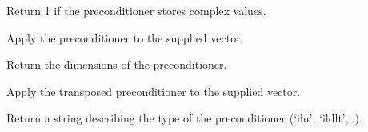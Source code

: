\documentclass[a4paper,11pt,english]{sphinxmanual}
\begin{document}
\begin{fulllineitems}
\begin{fulllineitems}
\label{\detokenize{python/cmdref_Precond:getfem.Precond.is_complex}}
Return 1 if the preconditioner stores complex values.

\end{fulllineitems}


\begin{fulllineitems}
\label{\detokenize{python/cmdref_Precond:getfem.Precond.mult}}
Apply the preconditioner to the supplied vector.

\end{fulllineitems}


\begin{fulllineitems}
\label{\detokenize{python/cmdref_Precond:getfem.Precond.size}}
Return the dimensions of the preconditioner.

\end{fulllineitems}


\begin{fulllineitems}
\label{\detokenize{python/cmdref_Precond:getfem.Precond.tmult}}
Apply the transposed preconditioner to the supplied vector.

\end{fulllineitems}


\begin{fulllineitems}
\label{\detokenize{python/cmdref_Precond:getfem.Precond.type}}
Return a string describing the type of the preconditioner (‘ilu’, ‘ildlt’,..).

\end{fulllineitems}


\end{fulllineitems}
\end{document}
